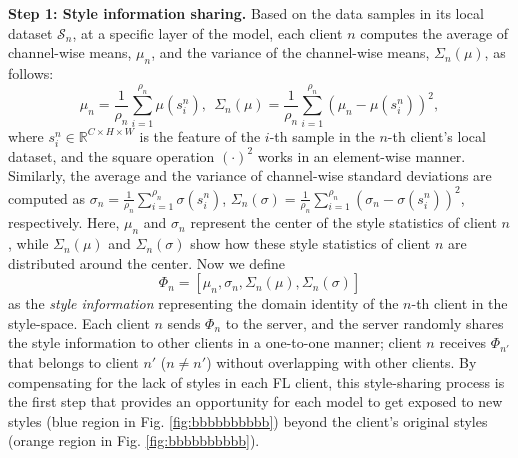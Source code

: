 \documentclass{article}
\theoremstyle{plain}
\theoremstyle{definition}
\theoremstyle{remark}
\begin{document}
\textbf{Step 1: Style information sharing.} Based on the  data samples in its local dataset $\mathcal{S}_n$, at a specific layer of the model, each client $n$ computes   the  average of channel-wise means, $\mu_n$,  and the variance of the channel-wise means, $\Sigma_n(\mu)$, as follows: 
 \begin{equation}\label{eq:mu}
\mu_n = \frac{1}{\rho_n}\sum_{i=1}^{\rho_n}\mu(s_i^n), \  \ \Sigma_n(\mu) = \frac{1}{\rho_n}\sum_{i=1}^{\rho_n}(\mu_n - \mu(s_i^n))^2,
\end{equation}
where $s_i^n\in\mathbb{R}^{C\times H\times W}$ is the feature of the $i$-th  sample in the $n$-th client's local dataset, and  the square operation $(\cdot)^2$  works in an element-wise manner. Similarly, the average and  the variance of channel-wise standard deviations are computed as $\sigma_n = \frac{1}{\rho_n}\sum_{i=1}^{\rho_n}\sigma(s_i^n)$, $\Sigma_n(\sigma) = \frac{1}{\rho_n}\sum_{i=1}^{\rho_n}(\sigma_n - \sigma(s_i^n))^2$,
respectively.  Here, $\mu_n$ and $\sigma_n$ represent the center of the style statistics of client $n$, while $\Sigma_n(\mu)$ and $\Sigma_n(\sigma)$ show how  these style statistics of client $n$ are distributed around the center. Now we define  
\begin{equation}
\Phi_n=[\mu_n, \sigma_n, \Sigma_n(\mu), \Sigma_n(\sigma)]
\end{equation}
as  the \textit{style information} representing the domain identity of the $n$-th client  in the style-space.  %
 Each client $n$ sends   $\Phi_n$  to the server, and the server randomly shares the style information   to other clients in a one-to-one manner;   client  $n$ receives  $\Phi_{n'}$ that belongs to   client  $n'$  ($n\neq n'$) without overlapping with other clients.   By compensating for the lack of styles  in each  FL client,  this style-sharing process is the first step that   provides an opportunity for each model to get exposed  to new styles (blue region in Fig. \ref{fig:bbbbbbbbbb}) beyond the client's original  styles  (orange region in Fig. \ref{fig:bbbbbbbbbb}). %
 
\end{document}
